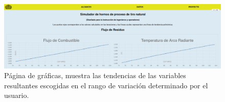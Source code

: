 \begin{figure}[hbt]
\begin{center}
\includegraphics[scale=0.18]{images/graficas.png}
\caption[Página de gráficas]{Página de gráficas, muestra las tendencias de las variables resultantes escogidas en el rango de variación determinado por el usuario.}
\label{fig:graficas}
\end{center}
\end{figure}





